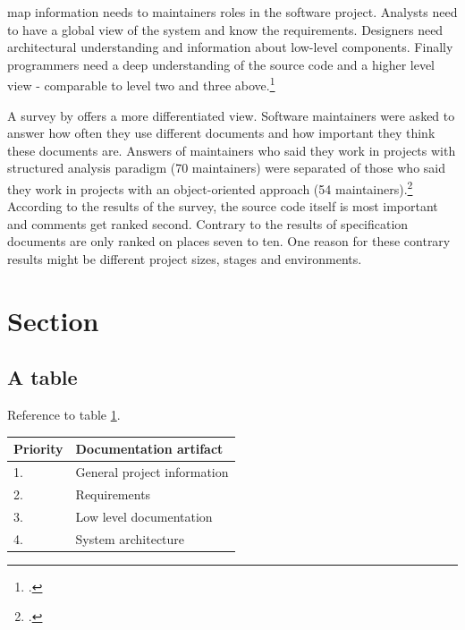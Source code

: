 \citeauthor{grubb2003software} map information needs to maintainers roles
in the software project. Analysts need to have a global view of the system and
know the requirements. Designers need architectural understanding and
information about low-level components. Finally programmers need a deep
understanding of the source code and a higher level view - comparable to level
two and three above.\footcite[Cf.][103-106]{grubb2003software}

A survey by \citeauthor{de_souza_study_2005} offers a more differentiated view.
Software maintainers were asked to answer how often they use different documents
and how important they think these documents are. Answers of maintainers who
said they work in projects with structured analysis paradigm (70 maintainers)
were separated of those who said they work in projects with an object-oriented
approach (54 maintainers).\footcite[Cf.][69-74]{de_souza_study_2005}
According to the results of the survey, the source code itself is most important
and comments get ranked second. Contrary to the results of \citeauthor{forward_relevance_2002}
specification documents are only ranked on places seven to ten.
One reason for these contrary results might be different project sizes, stages
and environments.


\FloatBarrier %
\newpage
\section{Section}

\subsection{A table}
\label{sec:atable}


Reference to table \ref{tab:importance_artifacts}.\\


\begin{table}[H]
\begin{center}
  \begin{tabular}{p{2cm}|p{8cm}}
	Priority &	Documentation artifact\\\hline
	1. &	General project information \\
	2. &	Requirements \\
	3. &	Low level documentation\\
	4. &	System architecture\\
  \end{tabular}
	\label{tab:importance_artifacts}
\end{center}
\end{table}




